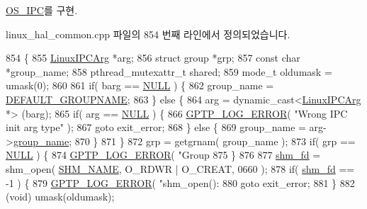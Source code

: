 \hyperlink{class_o_s___i_p_c_af0461840a5fc47851aa77477baf10f6b}{O\+S\+\_\+\+I\+PC}를 구현.



linux\+\_\+hal\+\_\+common.\+cpp 파일의 854 번째 라인에서 정의되었습니다.


\begin{DoxyCode}
854                                                   \{
855     \hyperlink{class_linux_i_p_c_arg}{LinuxIPCArg} *arg;
856     \textcolor{keyword}{struct }group *grp;
857     \textcolor{keyword}{const} \textcolor{keywordtype}{char} *group\_name;
858     pthread\_mutexattr\_t shared;
859     mode\_t oldumask = umask(0);
860 
861     \textcolor{keywordflow}{if}( barg == \hyperlink{openavb__types__base__pub_8h_a070d2ce7b6bb7e5c05602aa8c308d0c4}{NULL} ) \{
862         group\_name = \hyperlink{linux__hal__common_8hpp_a0d266ad5e945d9d5c8ad50ceef299d1a}{DEFAULT\_GROUPNAME};
863     \} \textcolor{keywordflow}{else} \{
864         arg = \textcolor{keyword}{dynamic\_cast<}\hyperlink{class_linux_i_p_c_arg}{LinuxIPCArg} *\textcolor{keyword}{>} (barg);
865         \textcolor{keywordflow}{if}( arg == \hyperlink{openavb__types__base__pub_8h_a070d2ce7b6bb7e5c05602aa8c308d0c4}{NULL} ) \{
866             \hyperlink{gptp__log_8hpp_afefbb1009717c128012bfeed94842987}{GPTP\_LOG\_ERROR}( \textcolor{stringliteral}{"Wrong IPC init arg type"} );
867             \textcolor{keywordflow}{goto} exit\_error;
868         \} \textcolor{keywordflow}{else} \{
869             group\_name = arg->\hyperlink{class_linux_i_p_c_arg_af79ba313643b1c6e634d705221930b84}{group\_name};
870         \}
871     \}
872     grp = getgrnam( group\_name );
873     \textcolor{keywordflow}{if}( grp == \hyperlink{openavb__types__base__pub_8h_a070d2ce7b6bb7e5c05602aa8c308d0c4}{NULL} ) \{
874         \hyperlink{gptp__log_8hpp_afefbb1009717c128012bfeed94842987}{GPTP\_LOG\_ERROR}( \textcolor{stringliteral}{"Group %
875     \}
876 
877     \hyperlink{class_linux_shared_memory_i_p_c_a67ca3e78936424920539c340223a0b0a}{shm\_fd} = shm\_open( \hyperlink{linux__ipc_8hpp_a86393b21e6f74e9870d92149e7fe7f20}{SHM\_NAME}, O\_RDWR | O\_CREAT, 0660 );
878     \textcolor{keywordflow}{if}( \hyperlink{class_linux_shared_memory_i_p_c_a67ca3e78936424920539c340223a0b0a}{shm\_fd} == -1 ) \{
879         \hyperlink{gptp__log_8hpp_afefbb1009717c128012bfeed94842987}{GPTP\_LOG\_ERROR}( \textcolor{stringliteral}{"shm\_open(): %
880         \textcolor{keywordflow}{goto} exit\_error;
881     \}
882     (void) umask(oldumask);
}}
\end{DoxyCode}

